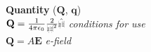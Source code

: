 \documentclass[9pt]{extarticle}
\def\rcurs{{\mbox{$\resizebox{.09in}{.08in}{\texttt{[image: ScriptR]}}$}}}
\def\brcurs{{\mbox{$\resizebox{.09in}{.08in}{\texttt{[image: BoldR]}}$}}}
\begin{document}
\begin{multicols}{3}
\textbf{Quantity} ($\mathbf{Q}$, $\mathbf{q}$) \\
$\mathbf{Q} = \frac{1}{4\pi\epsilon_{0}}\frac{2}{\rcurs^{2}}\hat{\brcurs}$  \textit{conditions for use} \\
$\mathbf{Q} = A\mathbf{E}$ \textit{e-field} \\
\end{multicols}
\end{document}
